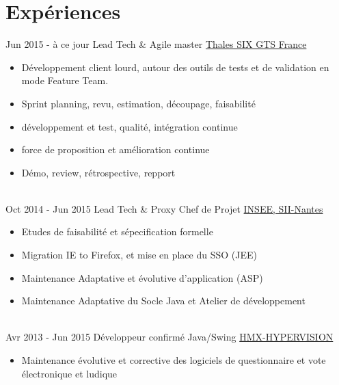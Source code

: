 \documentclass[letterpaper]{twentysecondcv} %
\begin{document}
\makeprofile %


\section{Expériences}

\begin{twenty} %
\twentyitem
    	{Jun 2015 -}
		{à ce jour}
        {Lead Tech \& Agile master}
        {\href{https://www.thalesgroup.com/fr}{Thales SIX GTS France}}
        {}
        {\begin{itemize} 		
      	\item Développement client lourd, autour des outils de tests et de validation en mode Feature Team.
        \item Sprint planning, revu, estimation, découpage, faisabilité
        \item développement et test, qualité, intégration continue
        \item force de proposition et amélioration continue
        \item Démo, review, rétrospective, repport
        \end{itemize}}
        \\
	\twentyitem
    	{Oct 2014 -}
		{Jun 2015}
        {Lead Tech \& Proxy Chef de Projet}
        {\href{https://www.insee.fr/fr/accueil}{INSEE, SII-Nantes}}
        {}
        {
        {\begin{itemize}
		\item Etudes de faisabilité et sépecification formelle
		\item Migration IE to Firefox, et mise en place du SSO (JEE)
		\item Maintenance Adaptative et évolutive d'application (ASP)
		\item Maintenance Adaptative du Socle Java et Atelier de développement
    	\end{itemize}}
        }
     \\
     \twentyitem
   		{Avr 2013 -}
		{Jun 2015}
        {Développeur confirmé Java/Swing}
        {\href{}{HMX-HYPERVISION}}
        {}
        {
        \begin{itemize}
        \item Maintenance évolutive et corrective des logiciels de questionnaire et vote électronique et ludique

\end{itemize}}
\end{twenty}
\end{document}

